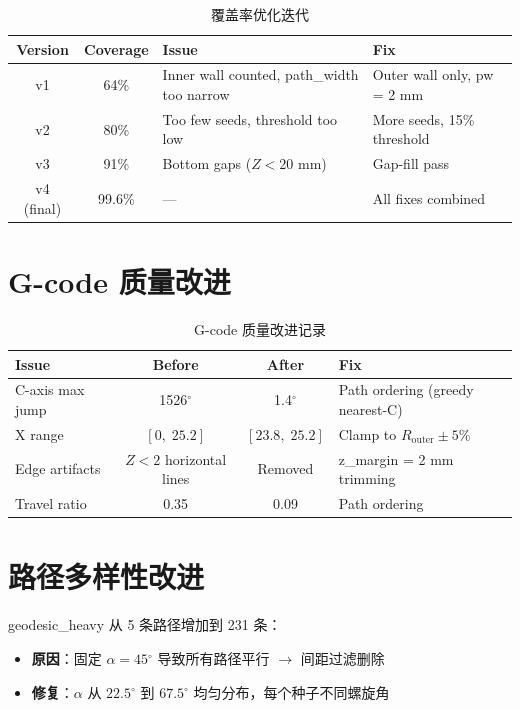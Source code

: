 \documentclass[11pt,a4paper]{article}
\begin{document}
\begin{table}[H]
\centering
\begin{tabularx}{\textwidth}{c c X X}
\toprule
\textbf{Version} & \textbf{Coverage} & \textbf{Issue} & \textbf{Fix} \\
\midrule
v1 & 64\% & Inner wall counted, path\_width too narrow & Outer wall only, pw = 2 mm \\
v2 & 80\% & Too few seeds, threshold too low & More seeds, 15\% threshold \\
v3 & 91\% & Bottom gaps ($Z < 20$ mm) & Gap-fill pass \\
v4 (final) & 99.6\% & --- & All fixes combined \\
\bottomrule
\end{tabularx}
\caption{覆盖率优化迭代}
\end{table}

\section{G-code 质量改进}

\begin{table}[H]
\centering
\begin{tabularx}{\textwidth}{X c c X}
\toprule
\textbf{Issue} & \textbf{Before} & \textbf{After} & \textbf{Fix} \\
\midrule
C-axis max jump & 1526$^\circ$ & 1.4$^\circ$ & Path ordering (greedy nearest-C) \\
X range & $[0,\; 25.2]$ & $[23.8,\; 25.2]$ & Clamp to $R_{\text{outer}} \pm 5\%$ \\
Edge artifacts & $Z < 2$ horizontal lines & Removed & z\_margin = 2 mm trimming \\
Travel ratio & 0.35 & 0.09 & Path ordering \\
\bottomrule
\end{tabularx}
\caption{G-code 质量改进记录}
\end{table}

\section{路径多样性改进}

geodesic\_heavy 从 5 条路径增加到 231 条：

\begin{itemize}[nosep]
\item \textbf{原因}：固定 $\alpha = 45$$^\circ$ 导致所有路径平行 $\to$ 间距过滤删除
\item \textbf{修复}：$\alpha$ 从 $22.5$$^\circ$ 到 $67.5$$^\circ$ 均匀分布，每个种子不同螺旋角
\end{itemize}
\end{document}
